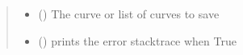 \documentclass[letterpaper,10pt,english]{sphinxmanual}
\begin{document}
\begin{fulllineitems}
\begin{quote}
\begin{description}
\begin{itemize}
\item {} 
 ({\hyperref[\detokenize{pydv:curve.Curve}]{}}) \textendash{} The curve or list of curves to save

\item {} 
 () \textendash{} prints the error stacktrace when True

\end{itemize}

\end{description}\end{quote}

\end{fulllineitems}

\end{document}
